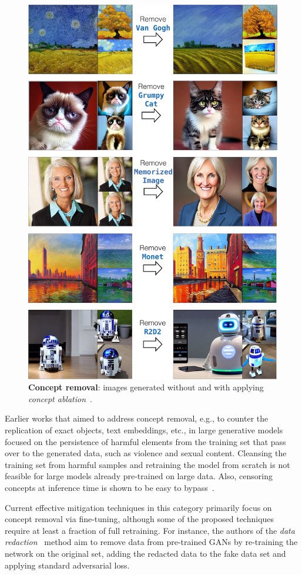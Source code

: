 \documentclass[conference,table]{IEEEtran}
\begin{document}
\begin{figure}[ht]
    \centering
    \includegraphics[width=0.9\linewidth]{figures/ablating-concepts_vertical.png}
    \caption{\textbf{Concept removal}: images generated without and with applying \textit{concept ablation}~\cite{kumari_ablating_2023}.}
    \label{fig:ablation}
\end{figure}
Earlier works that aimed to address concept removal, e.g., to counter the replication of exact objects, text embeddings, etc., in large generative models focused on the persistence of harmful elements from the training set that pass over to the generated data, such as violence and sexual content. 
Cleansing the training set from harmful samples and retraining the model from scratch is not feasible for large models already pre-trained on large data. 
Also, censoring concepts at inference time is shown to be easy to bypass~\cite{rando_red-teaming_2022}.

Current effective mitigation techniques in this category primarily focus on concept removal via fine-tuning, although some of the proposed techniques require at least a fraction of full retraining. 
For instance, the authors of the \textit{data redaction}~\cite{kong_data_2023} method aim to remove data from pre-trained GANs by re-training the network on the original set, adding the redacted data to the fake data set and applying standard adversarial loss. 
\end{document}
